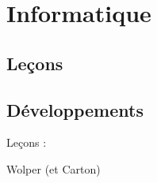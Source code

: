 \documentclass[../Agregation.tex]{subfiles}
\begin{document}
\part{Informatique}

\tableofcontents

\newrefsegment

\chapter{Leçons}





%
%
%






%







































\chapter{Développements}
Leçons :
\begin{itemize}
\end{itemize}
Wolper (et Carton)
\end{document}
